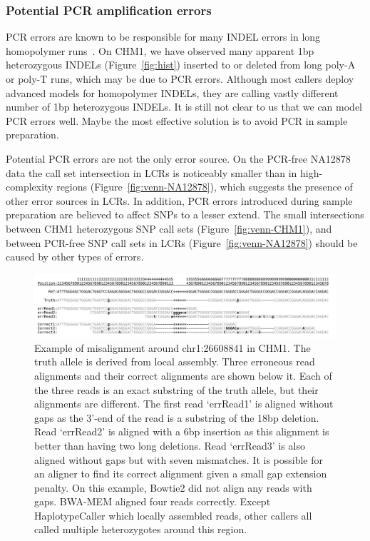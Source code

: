 \documentclass{bioinfo}
\begin{document}
\subsubsection{Potential PCR amplification errors}
PCR errors are known to be responsible for many INDEL
errors in long homopolymer runs~\citep{1000g:2012aa}. On CHM1, we have observed many apparent 1bp
heterozygous INDELs (Figure~\ref{fig:hist}) inserted to or deleted from long
poly-A or poly-T runs, which may be due to PCR errors. Although most callers
deploy advanced models for homopolymer INDELs, they are calling vastly
different number of 1bp heterozygous INDELs. It is still not clear to us that
we can model PCR errors well. Maybe the most effective solution
is to avoid PCR in sample preparation.

Potential PCR errors are not the only error source. On the PCR-free NA12878 data
the call set intersection in LCRs is noticeably smaller than in high-complexity
regions (Figure~\ref{fig:venn-NA12878}), which suggests the presence of other
error sources in LCRs. In addition, PCR errors introduced during sample preparation are believed to affect
SNPs to a lesser extend. The small intersections between CHM1 heterozygous SNP
call sets (Figure~\ref{fig:venn-CHM1}), and between PCR-free SNP call sets in
LCRs (Figure~\ref{fig:venn-NA12878}) should be caused by other types of
errors.

\begin{figure}
\includegraphics[width=\textwidth]{indel-exam}
\caption{Example of misalignment around chr1:26608841 in CHM1. The truth allele
is derived from local assembly. Three erroneous read alignments and their
correct alignments are shown below it. Each of the three reads is an exact
substring of the truth allele, but their alignments are different.  The first
read `errRead1' is aligned without gaps as the 3'-end of the read is a
substring of the 18bp deletion.  Read `errRead2' is aligned with a 6bp
insertion as this alignment is better than having two long deletions. Read
`errRead3' is also aligned without gaps but with seven mismatches. It is
possible for an aligner to find its correct alignment given a small gap
extension penalty. On this example, Bowtie2 did not align any reads with gaps.
BWA-MEM aligned four reads correctly. Except HaplotypeCaller which locally
assembled reads, other callers all called multiple heterozygotes around this
region.}\label{fig:realign}
\end{figure}
\end{document}
